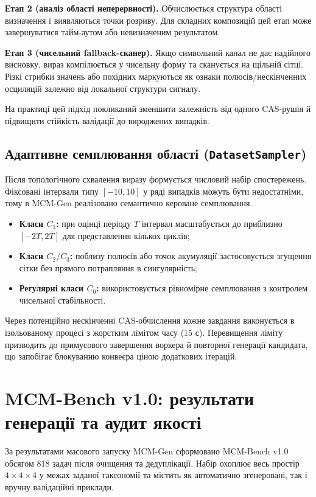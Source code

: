 \documentclass[11pt]{article}
\begin{document}
\textbf{Етап 2 (аналіз області неперервності).}
Обчислюється структура області визначення і виявляються точки розриву. Для складних композицій цей етап може завершуватися тайм-аутом або невизначеним результатом.

\textbf{Етап 3 (чисельний fallback-сканер).}
Якщо символьний канал не дає надійного висновку, вираз компілюється у чисельну форму та сканується на щільній сітці. Різкі стрибки значень або похідних маркуються як ознаки полюсів/нескінченних осциляцій залежно від локальної структури сигналу.

На практиці цей підхід покликаний зменшити залежність від одного CAS-рушія й підвищити стійкість валідації до вироджених випадків.

\subsection{Адаптивне семплювання області (\texttt{DatasetSampler})}

Після топологічного схвалення виразу формується числовий набір спостережень. Фіксовані інтервали типу $[-10,10]$ у ряді випадків можуть бути недостатніми, тому в MCM-Gen реалізовано семантично кероване семплювання.

\begin{itemize}[leftmargin=1.5em]
  \item \textbf{Класи $C_1$:} при оцінці періоду $T$ інтервал масштабується до приблизно $[-2T,2T]$ для представлення кількох циклів;
  \item \textbf{Класи $C_2/C_3$:} поблизу полюсів або точок акумуляції застосовується згущення сітки без прямого потрапляння в сингулярність;
  \item \textbf{Регулярні класи $C_0$:} використовується рівномірне семплювання з контролем чисельної стабільності.
\end{itemize}

Через потенційно нескінченні CAS-обчислення кожне завдання виконується в ізольованому процесі з жорстким лімітом часу (15 с). Перевищення ліміту призводить до примусового завершення воркера й повторної генерації кандидата, що запобігає блокуванню конвеєра ціною додаткових ітерацій.

\section{MCM-Bench v1.0: результати генерації та аудит якості}

За результатами масового запуску MCM-Gen сформовано MCM-Bench v1.0 обсягом 818 задач після очищення та дедуплікації. Набір охоплює весь простір $4\times4\times4$ у межах заданої таксономії та містить як автоматично згенеровані, так і вручну валідаційні приклади.
\end{document}
